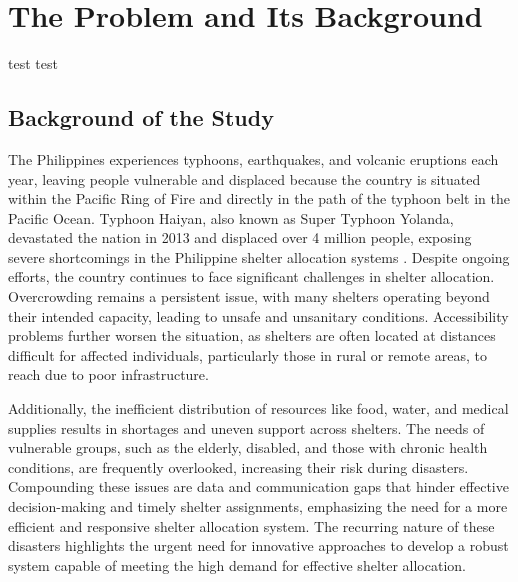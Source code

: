 \chapter{The Problem and Its Background}

test test

\section{Background of the Study}

The Philippines experiences typhoons, earthquakes, and volcanic eruptions each year, leaving people vulnerable and displaced because the country is situated within the Pacific Ring of Fire and directly in the path of the typhoon belt in the Pacific Ocean. Typhoon Haiyan, also known as Super Typhoon Yolanda, devastated the nation in 2013 and displaced over 4 million people, exposing severe shortcomings in the Philippine shelter allocation systems \parencite{Iuchi2019}. Despite ongoing efforts, the country continues to face significant challenges in shelter allocation. Overcrowding remains a persistent issue, with many shelters operating beyond their intended capacity, leading to unsafe and unsanitary conditions. Accessibility problems further worsen the situation, as shelters are often located at distances difficult for affected individuals, particularly those in rural or remote areas, to reach due to poor infrastructure.


Additionally, the inefficient distribution of resources like food, water, and medical supplies results in shortages and uneven support across shelters. The needs of vulnerable groups, such as the elderly, disabled, and those with chronic health conditions, are frequently overlooked, increasing their risk during disasters. Compounding these issues are data and communication gaps that hinder effective decision-making and timely shelter assignments, emphasizing the need for a more efficient and responsive shelter allocation system. The recurring nature of these disasters highlights the urgent need for innovative approaches to develop a robust system capable of meeting the high demand for effective shelter allocation.

